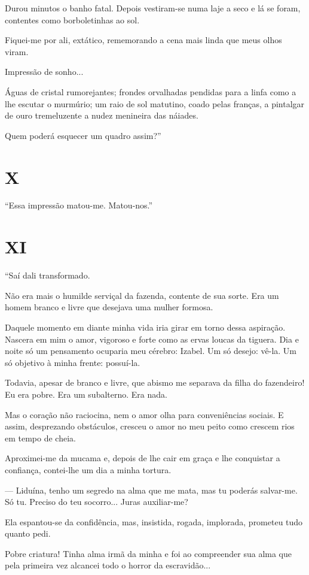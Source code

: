 Durou minutos o banho fatal. Depois vestiram-se numa laje a seco e lá se
foram, contentes como borboletinhas ao sol.

Fiquei-me por ali, extático, rememorando a cena mais linda que meus
olhos viram.

Impressão de sonho...

Águas de cristal rumorejantes; frondes orvalhadas pendidas para a linfa
como a lhe escutar o murmúrio; um raio de sol matutino, coado pelas
franças, a pintalgar de ouro tremeluzente a nudez menineira das náiades.

Quem poderá esquecer um quadro assim?''

\section{X}

``Essa impressão matou-me. Matou-nos.''

\section{XI}

``Saí dali transformado.

Não era mais o humilde serviçal da fazenda, contente de sua sorte. Era
um homem branco e livre que desejava uma mulher formosa.

Daquele momento em diante minha vida iria girar em torno dessa
aspiração. Nascera em mim o amor, vigoroso e forte como as ervas loucas
da tiguera. Dia e noite só um pensamento ocuparia meu cérebro: Izabel.
Um só desejo: vê-la. Um só objetivo à minha frente: possuí-la.

Todavia, apesar de branco e livre, que abismo me separava da filha do
fazendeiro! Eu era pobre. Era um subalterno. Era nada.

Mas o coração não raciocina, nem o amor olha para conveniências sociais.
E assim, desprezando obstáculos, cresceu o amor no meu peito como
crescem rios em tempo de cheia.

Aproximei-me da mucama e, depois de lhe cair em graça e lhe conquistar a
confiança, contei-lhe um dia a minha tortura.

--- Liduína, tenho um segredo na alma que me mata, mas tu poderás
salvar-me. Só tu. Preciso do teu socorro... Juras auxiliar-me?

Ela espantou-se da confidência, mas, insistida, rogada, implorada,
prometeu tudo quanto pedi.

Pobre criatura! Tinha alma irmã da minha e foi ao compreender sua alma
que pela primeira vez alcancei todo o horror da escravidão...

